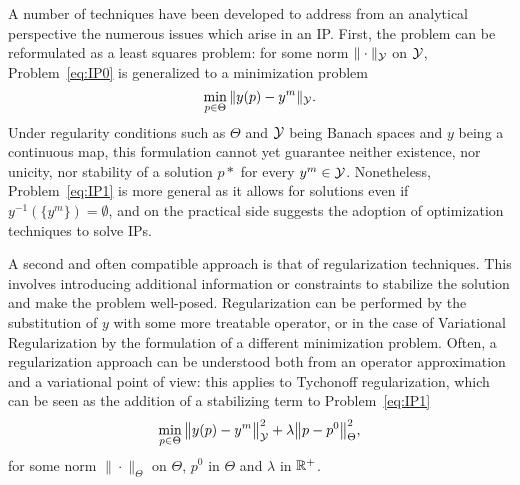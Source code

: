 A number of techniques have been developed to address from an analytical perspective the numerous issues which arise in an IP.
First, the problem can be reformulated as a least squares problem: for some norm $\| \cdot \| _\mathcal Y$ on $\mathcal Y$, Problem~\ref{eq:IP0} is generalized to a minimization problem
\begin{equation}\label{eq:IP1}
    \min_{p\in \Theta} \| y(p) - y^m \|_\mathcal Y.
\end{equation}
Under regularity conditions such as $\Theta$ and $\mathcal Y$ being Banach spaces and $y$ being a continuous map, this formulation cannot yet guarantee neither existence, nor unicity, nor stability of a solution $p*$ for every $y^m \in \mathcal Y$. Nonetheless, Problem~\ref{eq:IP1} is more general as it allows for solutions even if $y^{-1}(\{y^m\} )= \emptyset$, and on the practical side suggests the adoption of optimization techniques to solve IPs.

A second and often compatible approach is that of regularization techniques. 
This involves introducing additional information or constraints to stabilize the solution and make the problem well-posed. Regularization can be performed by the substitution of $y$ with some more treatable operator, or in the case of Variational Regularization by the formulation of a different minimization problem. 
Often, a regularization approach can be understood both from an operator approximation and a variational point of view: this applies to Tychonoff regularization, which can be seen as the addition of a stabilizing term to Problem~\ref{eq:IP1}
\begin{equation}\label{eq:Tycho}
    \min_{p\in \Theta} \big\| y(p) - y^m \big\|_\mathcal Y^2 + \lambda\big\| p - p^0 \big\|_\Theta^2,
\end{equation}
for some norm $\|\cdot\|_\Theta$ on $\Theta$, $p^0$ in $\Theta$ and $\lambda $ in $ \mathbb{R}^+$. \medskip


